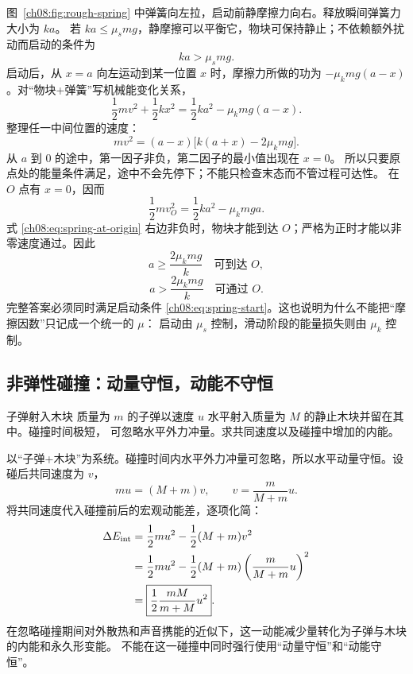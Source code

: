 {\begin{xesolution}
\ThARoughSpring

图~\ref{ch08:fig:rough-spring} 中弹簧向左拉，启动前静摩擦力向右。释放瞬间弹簧力大小为 $ka$。
若 $ka\le\mu_smg$，静摩擦可以平衡它，物块可保持静止；不依赖额外扰动而启动的条件为
\begin{equation}
  \boxed{ka>\mu_smg}.
  \label{ch08:eq:spring-start}
\end{equation}
启动后，从 $x=a$ 向左运动到某一位置 $x$ 时，摩擦力所做的功为 $-\mu_kmg(a-x)$。对“物块+弹簧”写机械能变化关系，
\[
  \frac12mv^2+\frac12kx^2
  =\frac12ka^2-\mu_kmg(a-x).
\]
整理任一中间位置的速度：
\[
 mv^2=(a-x)\bigl[k(a+x)-2\mu_kmg\bigr].
\]
从 $a$ 到 $0$ 的途中，第一因子非负，第二因子的最小值出现在 $x=0$。
所以只要原点处的能量条件满足，途中不会先停下；不能只检查末态而不管过程可达性。
在 $O$ 点有 $x=0$，因而
\begin{equation}
  \frac12mv_O^2=\frac12ka^2-\mu_kmga.
  \label{ch08:eq:spring-at-origin}
\end{equation}
式 \eqref{ch08:eq:spring-at-origin} 右边非负时，物块才能到达 $O$；严格为正时才能以非零速度通过。因此
\[
  \boxed{a\ge\frac{2\mu_kmg}{k}\quad\text{可到达 }O},
\]
\[
  \boxed{a>\frac{2\mu_kmg}{k}\quad\text{可通过 }O}.
\]
完整答案必须同时满足启动条件 \eqref{ch08:eq:spring-start}。这也说明为什么不能把“摩擦因数”只记成一个统一的 $\mu$：
启动由 $\mu_s$ 控制，滑动阶段的能量损失则由 $\mu_k$ 控制。
\end{xesolution}

\subsection{非弹性碰撞：动量守恒，动能不守恒}

\begin{origexamplebox}{子弹射入木块}\label{ch08:ex:s13-4-23}
质量为 $m$ 的子弹以速度 $u$ 水平射入质量为 $M$ 的静止木块并留在其中。碰撞时间极短，
可忽略水平外力冲量。求共同速度以及碰撞中增加的内能。

\ThQBullet
\end{origexamplebox}

\begin{xesolution}
\ThABullet

\par\Needspace{.60\textheight}
以“子弹+木块”为系统。碰撞时间内水平外力冲量可忽略，所以水平动量守恒。设碰后共同速度为 $v$，
\[
  m u=(M+m)v,\qquad \boxed{v=\frac{m}{M+m}u}.
\]
将共同速度代入碰撞前后的宏观动能差，逐项化简：
\begin{align*}
  \Delta E_{\rm int}
  &=\frac12mu^2-\frac12(M+m)v^2\\
  &=\frac12mu^2-\frac12(M+m)
    \left(\frac{m}{M+m}u\right)^2\\
  &=\boxed{\frac12\frac{mM}{m+M}u^2}.
\end{align*}
在忽略碰撞期间对外散热和声音携能的近似下，这一动能减少量转化为子弹与木块的内能和永久形变能。
不能在这一碰撞中同时强行使用“动量守恒”和“动能守恒”。
\end{xesolution}

}

